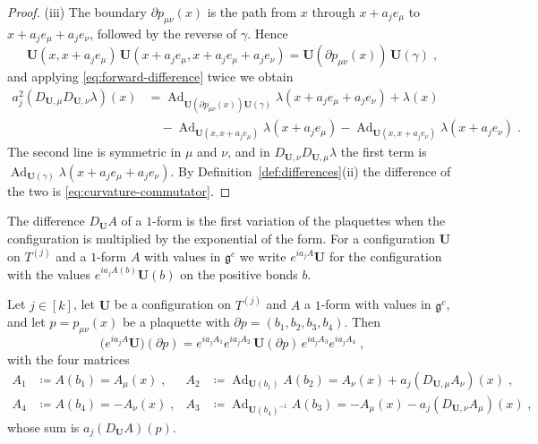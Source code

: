 \documentclass[11pt]{preprint}
\newcommand{\Ad}{\operatorname{Ad}}
\numberwithin{equation}{section}
\begin{document}
\begin{proof}
(iii) The boundary $\partial p_{\mu\nu}(x)$ is the path from $x$ through $x + a_je_\mu$ to $x + a_je_\mu + a_je_\nu$, followed by the reverse of $\gamma$. Hence
\[
    \mathbf U(x, x + a_je_\mu)\,\mathbf U(x + a_je_\mu, x + a_je_\mu + a_je_\nu) = \mathbf U(\partial p_{\mu\nu}(x))\,\mathbf U(\gamma)\;,
\]
and applying \eqref{eq:forward-difference} twice we obtain
\begin{align*}
    a_j^2(D_{\mathbf U,\mu}D_{\mathbf U,\nu}\lambda)(x)
    &= \Ad_{\mathbf U(\partial p_{\mu\nu}(x))\mathbf U(\gamma)}\lambda(x + a_je_\mu + a_je_\nu) + \lambda(x)\\
    &\quad - \Ad_{\mathbf U(x, x + a_je_\mu)}\lambda(x + a_je_\mu) - \Ad_{\mathbf U(x, x + a_je_\nu)}\lambda(x + a_je_\nu)\;.
\end{align*}
The second line is symmetric in $\mu$ and $\nu$, and in $D_{\mathbf U,\nu}D_{\mathbf U,\mu}\lambda$ the first term is $\Ad_{\mathbf U(\gamma)}\lambda(x + a_je_\mu + a_je_\nu)$. By Definition~\ref{def:differences}(ii) the difference of the two is \eqref{eq:curvature-commutator}.
\end{proof}

The difference $D_{\mathbf U}A$ of a $1$-form is the first variation of the plaquettes when the configuration is multiplied by the exponential of the form. For a configuration $\mathbf U$ on $T^{(j)}$ and a $1$-form $A$ with values in $\mathfrak g^c$ we write $e^{ia_jA}\mathbf U$ for the configuration with the values $e^{ia_jA(b)}\mathbf U(b)$ on the positive bonds $b$.

\begin{lemma}\label{lem:product-plaquette}
Let $j \in [k]$, let $\mathbf U$ be a configuration on $T^{(j)}$ and $A$ a $1$-form with values in $\mathfrak g^c$, and let $p = p_{\mu\nu}(x)$ be a plaquette with $\partial p = (b_1, b_2, b_3, b_4)$. Then
\begin{equation}\label{eq:product-plaquette}
    \bigl(e^{ia_jA}\mathbf U\bigr)(\partial p) = e^{ia_jA_1}e^{ia_jA_2}\,\mathbf U(\partial p)\,e^{ia_jA_3}e^{ia_jA_4}\;,
\end{equation}
with the four matrices
\begin{equation}\label{eq:product-exponents}
\begin{aligned}
    A_1 &\coloneqq A(b_1) = A_\mu(x)\;, &
    A_2 &\coloneqq \Ad_{\mathbf U(b_1)}A(b_2) = A_\nu(x) + a_j(D_{\mathbf U,\mu}A_\nu)(x)\;,\\
    A_4 &\coloneqq A(b_4) = -A_\nu(x)\;, &
    A_3 &\coloneqq \Ad_{\mathbf U(b_4)^{-1}}A(b_3) = -A_\mu(x) - a_j(D_{\mathbf U,\nu}A_\mu)(x)\;,
\end{aligned}
\end{equation}
whose sum is $a_j(D_{\mathbf U}A)(p)$.
\end{lemma}
\end{document}
